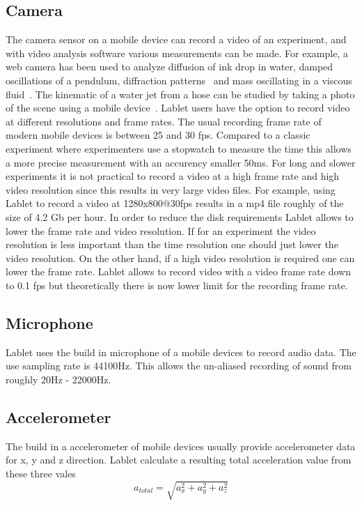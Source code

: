 \documentclass{sigchi}
\begin{document}
\subsection{Camera}
The camera sensor on a mobile device can record a video of
an experiment, and with video analysis software various
measurements can be made.
For example, a web camera has been used to analyze diffusion of ink
drop in water, damped oscillations of a pendulum, diffraction
patterns~\cite{Nedev2006} and mass oscillating in a viscous
fluid~\cite{Shamim2010}.
The kinematic of a water jet from a hose can be studied by taking a
photo of the scene using a mobile device~\cite{Falcao2009}.  Lablet
users have the option to record video at different resolutions and
frame rates.  The usual recording frame rate of modern mobile devices
is between 25 and 30 fps.  Compared to a classic experiment where
experimenters use a stopwatch to measure the time this allows a more
precise measurement with an accurency smaller 50ms.  For long and
slower experiments it is not practical to record a video at a high
frame rate and high video resolution since this results in very large
video files.  For example, using Lablet to record a video at
1280x800@30fps results in a mp4 file roughly of the size of 4.2 Gb per
hour.  In order to reduce the disk requirements Lablet allows to lower
the frame rate and video resolution.  If for an experiment the video
resolution is less important than the time resolution one should just
lower the video resolution.  On the other hand, if a high video
resolution is required one can lower the frame rate.  Lablet allows to
record video with a video frame rate down to 0.1 fps but theoretically
there is now lower limit for the recording frame rate.

\subsection{Microphone}
Lablet uses the build in microphone of a mobile devices to record
audio data.  The use sampling rate is 44100Hz.  This allows the
un-aliased recording of sound from roughly 20Hz - 22000Hz.

\subsection{Accelerometer}
The build in a accelerometer of mobile devices usually provide
accelerometer data for x, y and z direction.
Lablet calculate a resulting total acceleration value from these three
vales
\[
a_{total} = \sqrt{a_x^2 + a_y^2 + a_z^2}
\]
\end{document}
